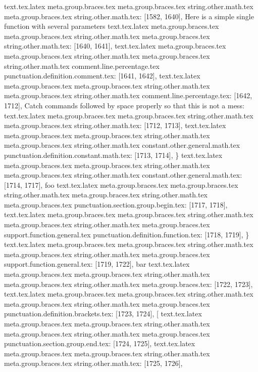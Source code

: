 {{{{{{{{{{{{{{{{{{{{{{{{{{{{{{{{{{{{{{{{text.tex.latex meta.group.braces.tex meta.group.braces.tex string.other.math.tex meta.group.braces.tex string.other.math.tex: [1582, 1640], { Here is a simple single function with several parameters
}
text.tex.latex meta.group.braces.tex meta.group.braces.tex string.other.math.tex meta.group.braces.tex string.other.math.tex: [1640, 1641], {
}
text.tex.latex meta.group.braces.tex meta.group.braces.tex string.other.math.tex meta.group.braces.tex string.other.math.tex comment.line.percentage.tex punctuation.definition.comment.tex: [1641, 1642], {%
text.tex.latex meta.group.braces.tex meta.group.braces.tex string.other.math.tex meta.group.braces.tex string.other.math.tex comment.line.percentage.tex: [1642, 1712], { Catch commands followed by space properly so that this is not a mess:}
text.tex.latex meta.group.braces.tex meta.group.braces.tex string.other.math.tex meta.group.braces.tex string.other.math.tex: [1712, 1713], {
}
text.tex.latex meta.group.braces.tex meta.group.braces.tex string.other.math.tex meta.group.braces.tex string.other.math.tex constant.other.general.math.tex punctuation.definition.constant.math.tex: [1713, 1714], {\}
text.tex.latex meta.group.braces.tex meta.group.braces.tex string.other.math.tex meta.group.braces.tex string.other.math.tex constant.other.general.math.tex: [1714, 1717], {foo}
text.tex.latex meta.group.braces.tex meta.group.braces.tex string.other.math.tex meta.group.braces.tex string.other.math.tex meta.group.braces.tex punctuation.section.group.begin.tex: [1717, 1718], {{}
text.tex.latex meta.group.braces.tex meta.group.braces.tex string.other.math.tex meta.group.braces.tex string.other.math.tex meta.group.braces.tex support.function.general.tex punctuation.definition.function.tex: [1718, 1719], {\}
text.tex.latex meta.group.braces.tex meta.group.braces.tex string.other.math.tex meta.group.braces.tex string.other.math.tex meta.group.braces.tex support.function.general.tex: [1719, 1722], {bar}
text.tex.latex meta.group.braces.tex meta.group.braces.tex string.other.math.tex meta.group.braces.tex string.other.math.tex meta.group.braces.tex: [1722, 1723], { }
text.tex.latex meta.group.braces.tex meta.group.braces.tex string.other.math.tex meta.group.braces.tex string.other.math.tex meta.group.braces.tex punctuation.definition.brackets.tex: [1723, 1724], {[}
text.tex.latex meta.group.braces.tex meta.group.braces.tex string.other.math.tex meta.group.braces.tex string.other.math.tex meta.group.braces.tex punctuation.section.group.end.tex: [1724, 1725], {}}
text.tex.latex meta.group.braces.tex meta.group.braces.tex string.other.math.tex meta.group.braces.tex string.other.math.tex: [1725, 1726], {
}}}}}}}}}}}}}}}}}}}}}}}}}}}}}}}}}}}}}}}}}}}}
